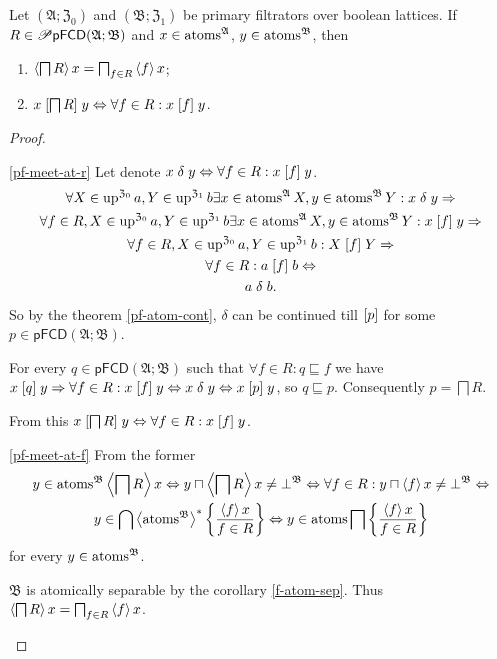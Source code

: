 \begin{thm}
\label{pf-meet-atom}Let $(\mathfrak{A};\mathfrak{Z}_{0})$ and $(\mathfrak{B};\mathfrak{Z}_{1})$
be primary filtrators over boolean lattices. If $R\in\mathscr{P}\mathsf{pFCD}(\mathfrak{A};\mathfrak{B})$
and $x\in\operatorname{atoms}^{\mathfrak{A}}$, $y\in\operatorname{atoms}^{\mathfrak{B}}$, then
\begin{enumerate}
\item \label{pf-meet-at-f}$\left\langle \bigsqcap R\right\rangle x=\bigsqcap_{f\in R}\left\langle f\right\rangle x$;
\item \label{pf-meet-at-r}$x\mathrel{\left[\bigsqcap R\right]}y\Leftrightarrow\forall f\in R:x\mathrel{\left[f\right]}y$.
\end{enumerate}
\end{thm}
\begin{proof}
~
\begin{widedisorder}
\item [{\ref{pf-meet-at-r}}] Let denote $x\mathrel\delta y\Leftrightarrow\forall f\in R:x\mathrel{\left[f\right]}y$.
\begin{gather*}
\forall X\in\operatorname{up}^{\mathfrak{Z}_{0}}a,Y\in\operatorname{up}^{\mathfrak{Z}_{1}}b\exists x\in\operatorname{atoms}^{\mathfrak{A}}X,y\in\operatorname{atoms}^{\mathfrak{B}}Y:x\mathrel\delta y\Rightarrow\\
\forall f\in R,X\in\operatorname{up}^{\mathfrak{Z}_{0}}a,Y\in\operatorname{up}^{\mathfrak{Z}_{1}}b\exists x\in\operatorname{atoms}^{\mathfrak{A}}X,y\in\operatorname{atoms}^{\mathfrak{B}}Y:x\mathrel{\left[f\right]}y\Rightarrow\\
\forall f\in R,X\in\operatorname{up}^{\mathfrak{Z}_{0}}a,Y\in\operatorname{up}^{\mathfrak{Z}_{1}}b:X\mathrel{\left[f\right]}Y\Rightarrow\\
\forall f\in R:a\mathrel{\left[f\right]}b\Leftrightarrow\\
a\mathrel\delta b.
\end{gather*}
So by the theorem \ref{pf-atom-cont}, $\delta$ can be continued
till $\mathrel{\left[p\right]}$ for some $p\in\mathsf{pFCD}(\mathfrak{A};\mathfrak{B})$.


For every $q\in\mathsf{pFCD}(\mathfrak{A};\mathfrak{B})$ such that
$\forall f\in R:q\sqsubseteq f$ we have $x\mathrel{\left[q\right]}y\Rightarrow\forall f\in R:x\mathrel{\left[f\right]}y\Leftrightarrow x\mathrel{\delta}y\Leftrightarrow x\mathrel{\left[p\right]}y$,
so $q\sqsubseteq p$. Consequently $p=\bigsqcap R$.


From this $x\mathrel{\left[\bigsqcap R\right]}y\Leftrightarrow\forall f\in R:x\mathrel{\left[f\right]}y$.

\item [{\ref{pf-meet-at-f}}] From the former 
\begin{multline*}
y\in\operatorname{atoms}^{\mathfrak{B}}\left\langle \bigsqcap R\right\rangle x\Leftrightarrow y\sqcap\left\langle \bigsqcap R\right\rangle x\ne\bot^{\mathfrak{B}}\Leftrightarrow\forall f\in R:y\sqcap\left\langle f\right\rangle x\ne\bot^{\mathfrak{B}}\Leftrightarrow\\
y\in\bigcap\left\langle \operatorname{atoms}^{\mathfrak{B}}\right\rangle ^{\ast}\left\{ \frac{\left\langle f\right\rangle x}{f\in R}\right\}\Leftrightarrow y\in\operatorname{atoms}\bigsqcap\left\{ \frac{\left\langle f\right\rangle x}{f\in R}\right\}
\end{multline*}
for every $y\in\operatorname{atoms}^{\mathfrak{B}}$.


$\mathfrak{B}$ is atomically separable by the corollary \ref{f-atom-sep}.
Thus $\left\langle \bigsqcap R\right\rangle x=\bigsqcap_{f\in R}\left\langle f\right\rangle x$.

\end{widedisorder}
\end{proof}

